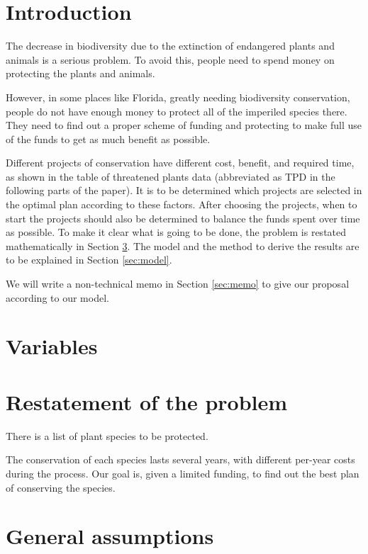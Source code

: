 \documentclass{article}
\begin{document}
\section{Introduction}
\label{sec:intro}

The decrease in biodiversity due to the extinction of endangered plants and animals is a serious problem.
To avoid this, people need to spend money on protecting the plants and animals.

However, in some places like Florida, greatly needing biodiversity conservation,
people do not have enough money to protect all of the imperiled species there.
They need to find out a proper scheme of funding and protecting to make full use of the funds to get as much benefit as possible.

Different projects of conservation have different cost, benefit, and required time,
as shown in the table of threatened plants data (abbreviated as TPD in the following parts of the paper).
It is to be determined which projects are selected in the optimal plan according to these factors.
After choosing the projects, when to start the projects should also be determined to balance the funds spent over time as possible.
To make it clear what is going to be done, the problem is restated mathematically in Section \ref{sec:restatement}.
The model and the method to derive the results are to be explained in Section \ref{sec:model}.

We will write a non-technical memo in Section \ref{sec:memo} to give our proposal according to our model.

\section{Variables}

\section{Restatement of the problem}
\label{sec:restatement}

There is a list of plant species to be protected.

The conservation of each species lasts several years, with different per-year costs during the process.
Our goal is, given a limited funding, to find out the best plan of conserving the species.

\section{General assumptions}
\end{document}
